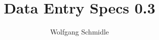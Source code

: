 \documentclass[11pt, a4paper, 
headinclude, 
normalheadings,
halfparskip-, 
pointlessnumbers]{scrartcl}
\begin{document}
\title{Data Entry Specs 0.3}
\author{Wolfgang Schmidle}
\maketitle

\tableofcontents


\end{document}
